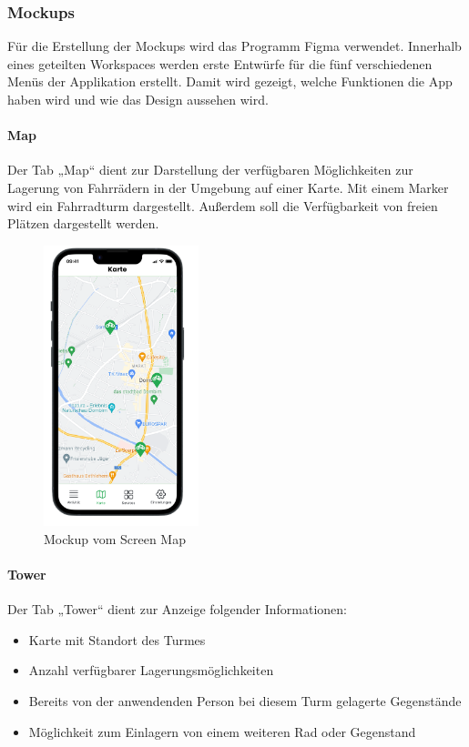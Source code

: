 \subsubsection{Mockups}
Für die Erstellung der \Gls{Mockup}s wird das Programm Figma verwendet. Innerhalb eines geteilten Workspaces werden erste Entwürfe für die fünf verschiedenen Menüs der Applikation erstellt. Damit wird gezeigt, welche Funktionen die App haben wird und wie das Design aussehen wird.

\bigskip


\paragraph{Map}Der \Gls{Tab} „Map“ dient zur Darstellung der verfügbaren Möglichkeiten zur Lagerung von Fahrrädern in der Umgebung auf einer Karte. Mit einem Marker wird ein Fahrradturm dargestellt. Außerdem soll die Verfügbarkeit von freien Plätzen dargestellt werden.

\begin{figure}[H]
  \centering
  \includegraphics[width=0.4\textwidth]{images/app_mock_map}
  \caption{\Gls{Mockup} vom Screen Map}
  \label{fig:screenmapmock}
\end{figure}
\bigskip
\clearpage

\paragraph{Tower}Der \Gls{Tab} „Tower“ dient zur Anzeige folgender Informationen:

\begin{itemize}
  \item Karte mit Standort des Turmes
  \item Anzahl verfügbarer Lagerungsmöglichkeiten
  \item Bereits von der anwendenden Person bei diesem Turm gelagerte Gegenstände
  \item Möglichkeit zum Einlagern von einem weiteren Rad oder Gegenstand
\end{itemize}

